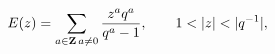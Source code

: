 \begin{equation}
E(z)=\sum_{a\in{\bf Z}\,a\neq 0} \frac{z^a q^a  }
{q^a -1}, \qquad 1<|z|<|q^{-1}|,
\label{SerE1}
\end{equation}

